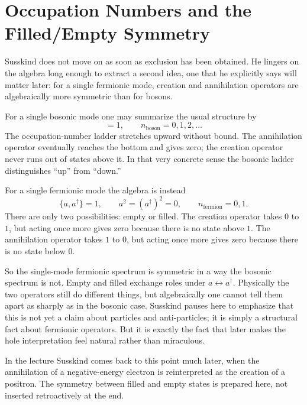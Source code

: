 \section{Occupation Numbers and the Filled/Empty Symmetry}

Susskind does not move on as soon as exclusion has been obtained. He lingers on the algebra long enough to extract a second idea, one that he explicitly says will matter later: for a single fermionic mode, creation and annihilation operators are algebraically more symmetric than for bosons.

For a single bosonic mode one may summarize the usual structure by
\begin{equation}
[a,a^\dagger]=1,
\qquad
n_{\text{boson}}=0,1,2,\dots
\end{equation}
The occupation-number ladder stretches upward without bound. The annihilation operator eventually reaches the bottom and gives zero; the creation operator never runs out of states above it. In that very concrete sense the bosonic ladder distinguishes ``up'' from ``down.''

For a single fermionic mode the algebra is instead
\begin{equation}
\{a,a^\dagger\}=1,
\qquad
a^2=(a^\dagger)^2=0,
\qquad
n_{\text{fermion}}=0,1.
\end{equation}
There are only two possibilities: empty or filled. The creation operator takes \(0\) to \(1\), but acting once more gives zero because there is no state above \(1\). The annihilation operator takes \(1\) to \(0\), but acting once more gives zero because there is no state below \(0\).

So the single-mode fermionic spectrum is symmetric in a way the bosonic spectrum is not. Empty and filled exchange roles under \(a\leftrightarrow a^\dagger\). Physically the two operators still do different things, but algebraically one cannot tell them apart as sharply as in the bosonic case. Susskind pauses here to emphasize that this is not yet a claim about particles and anti-particles; it is simply a structural fact about fermionic operators. But it is exactly the fact that later makes the hole interpretation feel natural rather than miraculous.

\begin{remark}
In the lecture Susskind comes back to this point much later, when the annihilation of a negative-energy electron is reinterpreted as the creation of a positron. The symmetry between filled and empty states is prepared here, not inserted retroactively at the end.
\end{remark}

